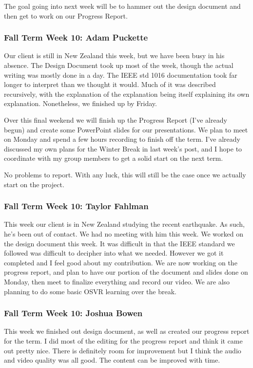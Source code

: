 \documentclass[draftclsnofoot,onecolumn]{IEEEtran}
\begin{document}
The goal going into next week will be to hammer out the design document and then get to work on our Progress Report.

\subsubsection{Fall Term Week 10: Adam Puckette}

Our client is still in New Zealand this week, but we have been busy in his absence. The Design Document took up most of the week, though the actual writing was mostly done in a day. The IEEE std 1016 documentation took far longer to interpret than we thought it would. Much of it was described recursively, with the explanation of the explanation being itself explaining its own explanation. Nonetheless, we finished up by Friday.

Over this final weekend we will finish up the Progress Report (I've already begun) and create some PowerPoint slides for our presentations. We plan to meet on Monday and spend a few hours recording to finish off the term. I've already discussed my own plans for the Winter Break in last week's post, and I hope to coordinate with my group members to get a solid start on the next term.

No problems to report. With any luck, this will still be the case once we actually start on the project.

\subsubsection{Fall Term Week 10: Taylor Fahlman}

This week our client is in New Zealand studying the recent earthquake. As such, he's been out of contact. We had no meeting with him this week. We worked on the design document this week. It was difficult in that the IEEE standard we followed was difficult to decipher into what we needed. However we got it completed and I feel good about my contribution. We are now working on the progress report, and plan to have our portion of the document and slides done on Monday, then meet to finalize everything and record our video. We are also planning to do some basic OSVR learning over the break.

\subsubsection{Fall Term Week 10: Joshua Bowen}

This week we finished out design document, as well as created our progress report for the term. I did most of the editing for the progress report and think it came out pretty nice. There is definitely room for improvement but I think the audio and video quality was all good. The content can be improved with time.
\end{document}
